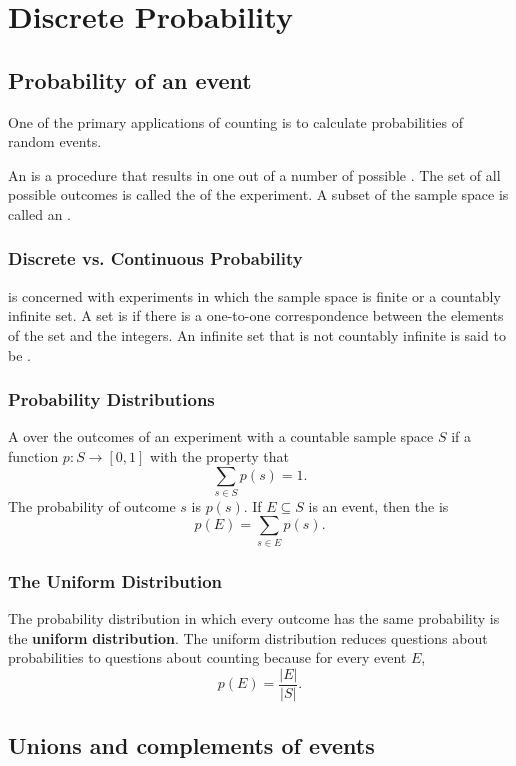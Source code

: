 \section{Discrete Probability}
\subsection{Probability of an event}
One of the primary applications of counting is to calculate probabilities of random events.

An  is a procedure that results in one out of a number of possible . The set of all possible outcomes is called the  of the experiment. A subset of the sample space is called an .

\subsubsection*{Discrete vs. Continuous Probability}
 is concerned with experiments in which the sample space is finite or a countably infinite set. A set is  if there is a one-to-one correspondence between the elements of the set and the integers. An infinite set that is not countably infinite is said to be .

\subsubsection*{Probability Distributions}
A  over the outcomes of an experiment with a countable sample space $S$ if a function $p: S \rightarrow [0,1]$ with the property that
\[
  \sum_{s \in S} p(s) = 1.
\]
The probability of outcome $s$ is $p(s)$. If $E \subseteq S$ is an event, then the  is
\[
  p(E) = \sum_{s \in E} p(s).
\]

\subsubsection*{The Uniform Distribution}
The probability distribution in which every outcome has the same probability is the \textbf{uniform} \textbf{distribution}. The uniform distribution reduces questions about probabilities to questions about counting because for every event $E$,
\[
  p(E) = \frac{|E|}{|S|}.
\]

\subsection{Unions and complements of events}

